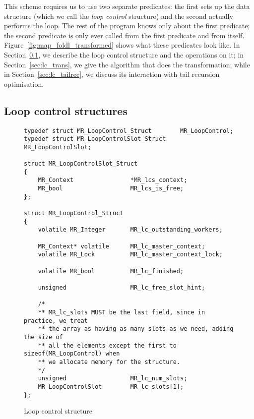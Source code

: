 This scheme requires us to use two separate predicates:
the first sets up the data structure
(which we call the \emph{loop control} structure)
and the second actually performs the loop.
The rest of the program knows only about the first predicate;
the second predicate is only ever called from the first predicate
and from itself.
Figure~\ref{fig:map_foldl_transformed} shows what these predicates look like.
In Section~\ref{sec:lc_structs},
we describe the loop control structure and the operations on it;
in Section~\ref{sec:lc_trans},
we give the algorithm that does the transformation;
while in Section~\ref{sec:lc_tailrec},
we discuss its interaction with tail recursion optimisation.

\subsection{Loop control structures}
\label{sec:lc_structs}

\begin{figure}
\begin{verbatim}
typedef struct MR_LoopControl_Struct        MR_LoopControl;
typedef struct MR_LoopControlSlot_Struct    MR_LoopControlSlot;

struct MR_LoopControlSlot_Struct
{
    MR_Context                *MR_lcs_context;
    MR_bool                   MR_lcs_is_free;
};

struct MR_LoopControl_Struct
{
    volatile MR_Integer       MR_lc_outstanding_workers;

    MR_Context* volatile      MR_lc_master_context;
    volatile MR_Lock          MR_lc_master_context_lock;

    volatile MR_bool          MR_lc_finished;

    unsigned                  MR_lc_free_slot_hint;

    /*
    ** MR_lc_slots MUST be the last field, since in practice, we treat
    ** the array as having as many slots as we need, adding the size of
    ** all the elements except the first to sizeof(MR_LoopControl) when
    ** we allocate memory for the structure.
    */
    unsigned                  MR_lc_num_slots;
    MR_LoopControlSlot        MR_lc_slots[1];
};
\end{verbatim}
\caption{Loop control structure}
\label{fig:loop_control_structure}
\end{figure}

